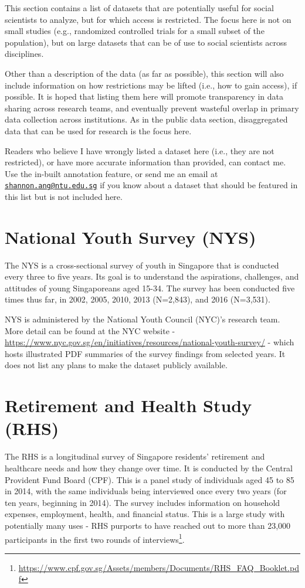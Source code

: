 \documentclass[openany]{book}
\let\rmarkdownfootnote\footnote%
\def\footnote{\protect\rmarkdownfootnote}
\begin{document}
This section contains a list of datasets that are potentially useful for
social scientists to analyze, but for which access is restricted. The
focus here is not on small studies (e.g., randomized controlled trials
for a small subset of the population), but on large datasets that can be
of use to social scientists across disciplines.

Other than a description of the data (as far as possible), this section
will also include information on how restrictions may be lifted (i.e.,
how to gain access), if possible. It is hoped that listing them here
will promote transparency in data sharing across research teams, and
eventually prevent wasteful overlap in primary data collection across
institutions. As in the public data section, disaggregated data that can
be used for research is the focus here.

Readers who believe I have wrongly listed a dataset here (i.e., they are
not restricted), or have more accurate information than provided, can
contact me. Use the in-built annotation feature, or send me an email at
\href{mailto:shannon.ang@ntu.edu.sg}{\nolinkurl{shannon.ang@ntu.edu.sg}}
if you know about a dataset that should be featured in this list but is
not included here.

\section{National Youth Survey (NYS)}\label{nys}

The NYS is a cross-sectional survey of youth in Singapore that is
conducted every three to five years. Its goal is to understand the
aspirations, challenges, and attitudes of young Singaporeans aged 15-34.
The survey has been conducted five times thus far, in 2002, 2005, 2010,
2013 (N=2,843), and 2016 (N=3,531).

NYS is administered by the National Youth Council (NYC)'s research team.
More detail can be found at the NYC website -
\url{https://www.nyc.gov.sg/en/initiatives/resources/national-youth-survey/}
- which hosts illustrated PDF summaries of the survey findings from
selected years. It does not list any plans to make the dataset publicly
available.

\section{Retirement and Health Study (RHS)}\label{rhs}

The RHS is a longitudinal survey of Singapore residents' retirement and
healthcare needs and how they change over time. It is conducted by the
Central Provident Fund Board (CPF). This is a panel study of individuals
aged 45 to 85 in 2014, with the same individuals being interviewed once
every two years (for ten years, beginning in 2014). The survey includes
information on household expenses, employment, health, and financial
status. This is a large study with potentially many uses - RHS purports
to have reached out to more than 23,000 participants in the first two
rounds of interviews\footnote{\url{https://www.cpf.gov.sg/Assets/members/Documents/RHS_FAQ_Booklet.pdf}}.
\end{document}
